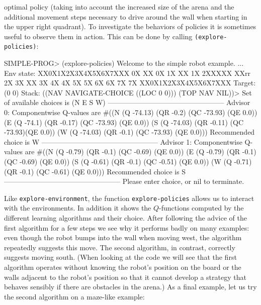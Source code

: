\documentclass[a4paper]{amsart}
\begin{document}
optimal policy (taking into account the increased size of the arena
and the additional movement steps necessary to drive around the wall
when starting in the upper right quadrant).  To investigate the
behaviors of policies it is sometimes useful to observe them in
action.  This can be done by calling \texttt{(explore-policies)}:
\begin{Code}
  SIMPLE-PROG> (explore-policies)
  Welcome to the simple robot example.
  \lsq...\rsq
  Env state: 
  XX0X1X2X3X4X5X6X7XXX
  0X      XX        0X
  1X      XX        1X
  2XXXXX  XXrr      2X
  3X      XX        3X
  4X                4X
  5X                5X
  6X                6X
  7X                7X
  XX0X1X2X3X4X5X6X7XXX
  Target: (0 0)
  Stack: ((NAV NAVIGATE-CHOICE ((LOC 0 0))) (TOP NAV NIL))>
  Set of available choices is (N E S W)
  --------------------------------------------------
  Advisor 0: 
  Componentwise Q-values are
    #((N (Q -74.13) (QR -0.2) (QC -73.93) (QE 0.0))
      (E (Q -74.1) (QR -0.17) (QC -73.93) (QE 0.0))
      (S (Q -74.03) (QR -0.11) (QC -73.93)(QE 0.0))
      (W (Q -74.03) (QR -0.1) (QC -73.93) (QE 0.0)))
  Recommended choice is W
  --------------------------------------------------
  Advisor 1: 
  Componentwise Q-values are
    #((N (Q -0.79) (QR -0.1) (QC -0.69) (QE 0.0))
      (E (Q -0.79) (QR -0.1) (QC -0.69) (QE 0.0))
      (S (Q -0.61) (QR -0.1) (QC -0.51) (QE 0.0))
      (W (Q -0.71) (QR -0.1) (QC -0.61) (QE 0.0)))
  Recommended choice is S
  --------------------------------------------------
  Please enter choice, or nil to terminate. 
\end{Code}
Like \texttt{explore-environment}, the function
\texttt{explore-policies} allows us to interact with the environments.
In addition it shows the $Q$-functions computed by the different
learning algorithms and their choice.  After following the advice of
the first algorithm for a few steps we see why it performs badly on
many examples: even though the robot bumps into the wall when moving
west, the algorithm repeatedly suggests this move.  The second
algorithm, in contrast, correctly suggests moving south.  (When
looking at the code we will see that the first algorithm operates
without knowing the robot's position on the board or the walls
adjacent to the robot's position so that it cannot develop a strategy
that behaves sensibly if there are obstacles in the arena.)  As a
final example, let us try the second algorithm on a maze-like example:
\end{document}
